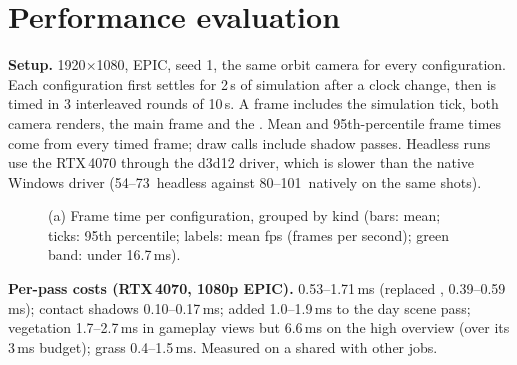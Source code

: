 \section{Performance evaluation}
\label{sec:perf}
\textbf{Setup.} 1920$\times$1080, EPIC, seed 1, the same orbit camera for every configuration. Each configuration first settles for 2\,s of simulation after a clock change, then is
timed in 3 interleaved rounds of 10\,s. A frame includes the simulation tick, both  camera renders, the main frame
and the . Mean and 95th-percentile frame times come from every timed frame; draw calls include shadow passes.
Headless runs use the RTX\,4070 through the  d3d12 driver, which is slower than the native Windows driver
(54--73\, headless against 80--101\, natively on the same shots).

\begin{table}[htbp]
\caption{Benchmark. Day = 10:30, no enemies, UAVs (uncrewed aerial vehicles) docked; night = 23:00 with intruder waves, both UAVs flying and
searchlights on.}\label{tab:bench}
\centering\small
\benchtable
\end{table}

\begin{figure}[htbp]
\centering{}
\caption{(a) Frame time per configuration, grouped by kind (bars: mean; ticks: 95th percentile; labels: mean fps (frames per second);
green band: under 16.7\,ms).}
\label{fig:bench}
\end{figure}



\textbf{Per-pass costs (RTX\,4070, 1080p EPIC).}  0.53--1.71\,ms (replaced , 0.39--0.59\,ms); contact
shadows 0.10--0.17\,ms;  added 1.0--1.9\,ms to the day scene pass; vegetation 1.7--2.7\,ms in gameplay views but 6.6\,ms
on the high overview (over its 3\,ms budget); grass 0.4--1.5\,ms. Measured on a  shared with other jobs.
